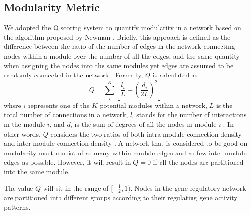 \subsection{Modularity Metric}
We adopted the Q scoring system to quantify modularity in a network based on the algorithm proposed by Newman \cite{newman2004finding}. Briefly, this approach is defined as the difference between the ratio of the number of edges in the network connecting nodes within a module over the number of all the edges, and the same quantity when assigning the nodes into the same modules yet edges are assumed to be randomly connected in the network \cite{kashtan2005spontaneous}. Formally, $Q$ is calculated as 
\begin{equation}
Q = \sum_{i}^{K}[\frac{l_i}{L} - (\frac{d_i}{2L})^2]
\end{equation}
where $i$ represents one of the $K$ potential modules within a network, $L$ is the total number of connections in a network, $l_i$ stands for the number of interactions in the module $i$, and $d_i$ is the sum of degrees of all the nodes in module $i$ \cite{espinosa2010specialization}. In other words, $Q$ considers the two ratios of both intra-module connection density and inter-module connection density \cite{newman2004finding}. A network that is considered to be good on modularity must consist of as many within-module edges and as few inter-module edges as possible. However, it will result in $Q=0$ if all the nodes are partitioned into the same module. 

The value $Q$ will sit in the range of $\left.[-\frac{1}{2}, 1\right.)$. Nodes in the gene regulatory network are partitioned into different groups according to their regulating gene activity patterns. 




